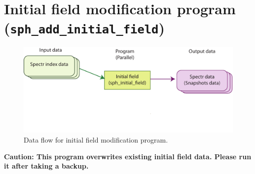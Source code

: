 \section{Initial field modification program \\
({\tt sph\_add\_initial\_field})}
\label{sec:ad_initial_field}
%
\begin{figure}[htbp]
\begin{center}
\includegraphics*[width=130mm]{images/flow_ini}
\end{center}
\caption{Data flow for initial field modification program.}
\label{fig:flow_add_ini}
\end{figure}
%
{\bf Caution: This program overwrites existing initial field data. Please run it after taking a backup.} \\

